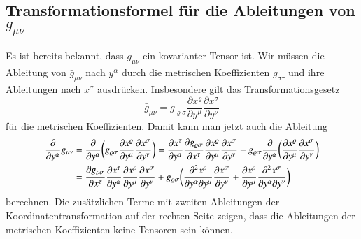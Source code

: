 \subsection{Transformationsformel für die Ableitungen von $g_{\mu\nu}$}
Es ist bereits bekannt, dass $g_{\mu\nu}$ ein kovarianter Tensor ist.
Wir müssen die Ableitung von $\bar g_{\mu\nu}$ nach $y^\alpha$ durch
die metrischen Koeffizienten $g_{\sigma\tau}$ und ihre Ableitungen
nach $x^\sigma$ ausdrücken.
Insbesondere gilt das Transformationsgesetz
\begin{equation*}
\bar g_{\mu\nu}
=
g_{\varrho\sigma}
\frac{\partial x^\varrho}{\partial y^\mu}
\frac{\partial x^\sigma}{\partial y^\nu}
\end{equation*}
für die metrischen Koeffizienten. 
Damit kann man jetzt auch die Ableitung 
\begin{align}
\frac{\partial}{\partial y^\alpha}\bar g_{\mu\nu}
&=
\frac{\partial}{\partial y^\alpha} 
\biggl(
g_{\varrho\sigma}
\frac{\partial x^\varrho}{\partial y^\mu}
\frac{\partial x^\sigma}{\partial y^\nu}
\biggr)
=
\frac{\partial x^\tau}{\partial y^\alpha}
\frac{\partial g_{\varrho\sigma} }{\partial x^\tau}
\frac{\partial x^\varrho}{\partial y^\mu}
\frac{\partial x^\sigma}{\partial y^\nu}
+
g_{\varrho\sigma}
\frac{\partial}{\partial y^\alpha} 
\biggl(
\frac{\partial x^\varrho}{\partial y^\mu}
\frac{\partial x^\sigma}{\partial y^\nu}
\biggr)
\notag
\\
&=
\frac{\partial g_{\varrho\sigma}}{\partial x^\tau}
\frac{\partial x^\tau}{\partial y^\alpha}
\frac{\partial x^\varrho}{\partial y^\mu}
\frac{\partial x^\sigma}{\partial y^\nu}
+
g_{\varrho\sigma}
\biggl(
\frac{\partial^2 x^\varrho}{\partial y^\alpha\partial y^\mu}
\frac{\partial x^\sigma}{\partial y^\nu}
+
\frac{\partial x^\varrho}{\partial y^\mu}
\frac{\partial^2 x^\sigma}{\partial y^\alpha\partial y^\nu}
\biggr)
\label{skript:trafo:gabl}
\end{align}
berechnen.
Die zusätzlichen Terme mit zweiten Ableitungen der Koordinatentransformation
auf der rechten Seite zeigen, dass die Ableitungen der metrischen Koeffizienten
keine Tensoren sein können.

